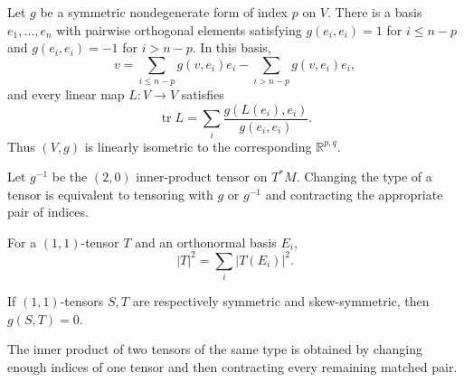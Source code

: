 \begin{remark}
  \label{rem:pet-ch1-ex-10}


  Let $g$ be a symmetric nondegenerate form of index $p$ on $V$. There is a
  basis $e_1,\ldots,e_n$ with pairwise orthogonal elements satisfying
  $g(e_i,e_i)=1$ for $i\le n-p$ and $g(e_i,e_i)=-1$ for $i>n-p$. In this basis,
  \[
    v=\sum_{i\le n-p}g(v,e_i)e_i-
      \sum_{i>n-p}g(v,e_i)e_i,
  \]
  and every linear map $L:V\to V$ satisfies
  \[
    \operatorname{tr}L
      =\sum_i\frac{g(L(e_i),e_i)}{g(e_i,e_i)}.
  \]
  Thus $(V,g)$ is linearly isometric to the corresponding $\mathbb{R}^{p,q}$.
\end{remark}

\begin{remark}
  \label{rem:pet-ch1-ex-11}


  Let $g^{-1}$ be the $(2,0)$ inner-product tensor on $T^*M$. Changing the type
  of a tensor is equivalent to tensoring with $g$ or $g^{-1}$ and contracting
  the appropriate pair of indices.
\end{remark}

\begin{remark}
  \label{rem:pet-ch1-ex-12}


  For a $(1,1)$-tensor $T$ and an orthonormal basis $E_i$,
  \[
    |T|^2=\sum_i|T(E_i)|^2.
  \]
\end{remark}

\begin{remark}
  \label{rem:pet-ch1-ex-13}


  If $(1,1)$-tensors $S,T$ are respectively symmetric and skew-symmetric, then
  $g(S,T)=0$.
\end{remark}

\begin{remark}
  \label{rem:pet-ch1-ex-14}


  The inner product of two tensors of the same type is obtained by changing
  enough indices of one tensor and then contracting every remaining matched
  pair.
\end{remark}

